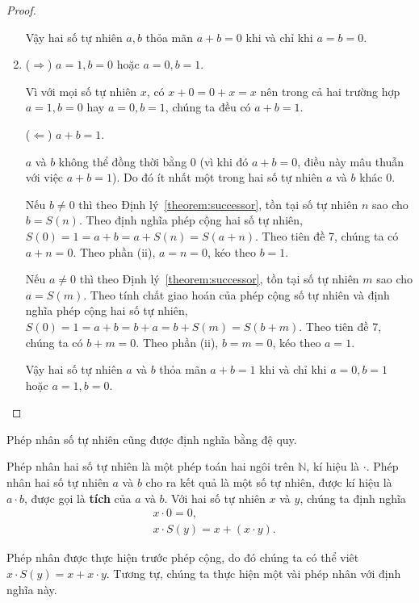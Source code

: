 \begin{proof}
\begin{enumerate}[label={(\roman*)}]
              Vậy hai số tự nhiên $a, b$ thỏa mãn $a + b = 0$ khi và chỉ khi $a = b = 0$.
        \item ($\Rightarrow$) $a = 1, b = 0$ hoặc $a = 0, b = 1$.

              Vì với mọi số tự nhiên $x$, có $x + 0 = 0 + x = x$ nên trong cả hai trường hợp $a = 1, b = 0$ hay $a = 0, b = 1$, chúng ta đều có $a + b = 1$.

              ($\Leftarrow$) $a + b = 1$.

              $a$ và $b$ không thể đồng thời bằng $0$ (vì khi đó $a + b = 0$, điều này mâu thuẫn với việc $a + b = 1$). Do đó ít nhất một trong hai số tự nhiên $a$ và $b$ khác $0$.

              Nếu $b\ne 0$ thì theo Định lý~\ref{theorem:successor}, tồn tại số tự nhiên $n$ sao cho $b = S(n)$. Theo định nghĩa phép cộng hai số tự nhiên, $S(0) = 1 = a + b = a + S(n) = S(a + n)$. Theo tiên đề 7, chúng ta có $a + n = 0$. Theo phần (ii), $a = n = 0$, kéo theo $b = 1$.

              Nếu $a\ne 0$ thì theo Định lý~\ref{theorem:successor}, tồn tại số tự nhiên $m$ sao cho $a = S(m)$. Theo tính chất giao hoán của phép cộng số tự nhiên và định nghĩa phép cộng hai số tự nhiên, $S(0) = 1 = a + b = b + a = b + S(m) = S(b + m)$. Theo tiên đề 7, chúng ta có $b + m = 0$. Theo phần (ii), $b = m = 0$, kéo theo $a = 1$.

              Vậy hai số tự nhiên $a$ và $b$ thỏa mãn $a + b = 1$ khi và chỉ khi $a = 0, b = 1$ hoặc $a = 1, b = 0$.
    \end{enumerate}
\end{proof}

Phép nhân số tự nhiên cũng được định nghĩa bằng đệ quy.
\begin{definition}
    Phép nhân hai số tự nhiên là một phép toán hai ngôi trên $\mathbb{N}$, kí hiệu là $\cdot$. Phép nhân hai số tự nhiên $a$ và $b$ cho ra kết quả là một số tự nhiên, được kí hiệu là $a\cdot b$, được gọi là \textbf{tích} của $a$ và $b$. Với hai số tự nhiên $x$ và $y$, chúng ta định nghĩa
    \begin{align*}
         & x\cdot 0 = 0,                 \\
         & x\cdot S(y) = x + (x\cdot y).
    \end{align*}
\end{definition}

Phép nhân được thực hiện trước phép cộng, do đó chúng ta có thể viêt $x\cdot S(y) = x + x\cdot y$. Tương tự, chúng ta thực hiện một vài phép nhân với định nghĩa này.

